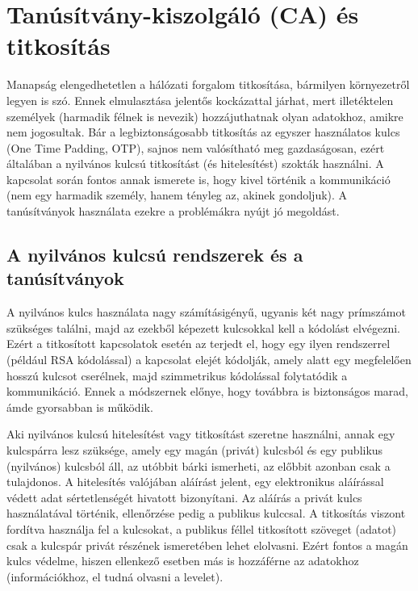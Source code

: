 \chapter{Tanúsítvány-kiszolgáló (CA) és titkosítás}

Manapság elengedhetetlen a hálózati forgalom titkosítása, bármilyen környezetről legyen is szó. Ennek elmulasztása
jelentős kockázattal járhat, mert illetéktelen személyek (harmadik félnek is nevezik) hozzájuthatnak olyan adatokhoz,
amikre nem jogosultak. Bár a legbiztonságosabb titkosítás az egyszer használatos kulcs (One Time Padding, OTP), sajnos
nem valósítható meg gazdaságosan, ezért általában a nyilvános kulcsú titkosítást (és hitelesítést) szokták
használni. A kapcsolat során fontos annak ismerete is, hogy kivel történik a kommunikáció (nem egy harmadik személy,
hanem tényleg az, akinek gondoljuk). A tanúsítványok használata ezekre a problémákra nyújt jó megoldást.


\section{A nyilvános kulcsú rendszerek és a tanúsítványok}
A nyilvános kulcs használata nagy számításigényű, ugyanis két nagy prímszámot szükséges találni, majd az ezekből
képezett kulcsokkal kell a kódolást elvégezni. Ezért a titkosított kapcsolatok esetén az terjedt el, hogy egy ilyen
rendszerrel (például RSA kódolással) a kapcsolat elejét kódolják, amely alatt egy megfelelően hosszú kulcsot cserélnek,
majd szimmetrikus kódolással folytatódik a kommunikáció. Ennek a módszernek előnye, hogy továbbra is biztonságos marad,
ámde gyorsabban is működik.

Aki nyilvános kulcsú hitelesítést vagy titkosítást szeretne használni, annak egy kulcspárra lesz szüksége, amely egy
magán (privát) kulcsból és egy publikus (nyilvános) kulcsból áll, az utóbbit bárki ismerheti, az előbbit azonban csak a
tulajdonos. A hitelesítés valójában aláírást jelent, egy elektronikus aláírással védett adat sértetlenségét hivatott
bizonyítani. Az aláírás a privát kulcs használatával történik, ellenőrzése pedig a publikus kulccsal. A titkosítás
viszont fordítva használja fel a kulcsokat, a publikus féllel titkosított szöveget (adatot) csak a kulcspár privát
részének ismeretében lehet elolvasni. Ezért fontos a magán kulcs védelme, hiszen ellenkező esetben más is hozzáférne az
adatokhoz (információkhoz, el tudná olvasni a levelet).

